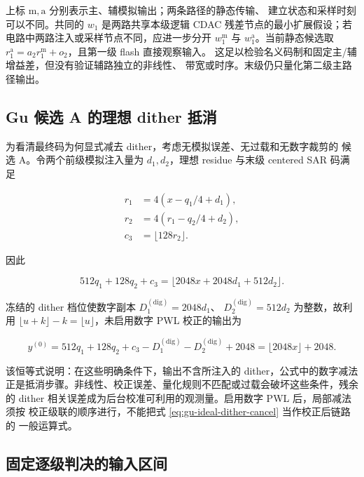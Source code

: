 \documentclass[11pt,a4paper]{ctexart}
\theoremstyle{adcplain}
\theoremstyle{definition}
\begin{document}
上标 $\mathrm m,\mathrm a$ 分别表示主、辅模拟输出；两条路径的静态传输、
建立状态和采样时刻可以不同。共同的 $w_1$ 是两路共享本级逻辑 CDAC
残差节点的最小扩展假设；若电路中两路注入或采样节点不同，应进一步分开
$w_1^{\mathrm m}$ 与 $w_1^{\mathrm a}$。当前静态候选取
$r_1^{\mathrm a}=a_2r_1^{\mathrm m}+o_2$，且第一级 flash 直接观察输入。
这足以检验名义码制和固定主/辅增益差，但没有验证辅路独立的非线性、
带宽或时序。末级仍只量化第二级主路径输出。

\subsection{Gu 候选 A 的理想 dither 抵消}

为看清最终码为何显式减去 dither，考虑无模拟误差、无过载和无数字裁剪的
候选 A。令两个前级模拟注入量为 $d_1,d_2$，理想 residue 与末级 centered
SAR 码满足

\begin{align}
  r_1&=4(x-q_1/4+d_1),\\
  r_2&=4(r_1-q_2/4+d_2),\\
  c_3&=\lfloor128r_2\rfloor.
\end{align}

因此

\begin{equation}
  512q_1+128q_2+c_3
  =\lfloor2048x+2048d_1+512d_2\rfloor.
  \label{eq:gu-raw-dither}
\end{equation}

冻结的 dither 档位使数字副本 $D_1^{(\mathrm{dig})}=2048d_1$、
$D_2^{(\mathrm{dig})}=512d_2$ 为整数，故利用
$\lfloor u+k\rfloor-k=\lfloor u\rfloor$，未启用数字 PWL 校正的输出为

\begin{equation}
  y^{(0)}=512q_1+128q_2+c_3-D_1^{(\mathrm{dig})}
    -D_2^{(\mathrm{dig})}+2048
  =\lfloor2048x\rfloor+2048.
  \label{eq:gu-ideal-dither-cancel}
\end{equation}

该恒等式说明：在这些明确条件下，输出不含所注入的 dither，公式中的数字减法
正是抵消步骤。非线性、校正误差、量化规则不匹配或过载会破坏这些条件，残余的
dither 相关误差成为后台校准可利用的观测量。启用数字 PWL 后，局部减法须按
校正级联的顺序进行，不能把式 \eqref{eq:gu-ideal-dither-cancel} 当作校正后链路的
一般运算式。

\subsection{固定逐级判决的输入区间}
\end{document}
